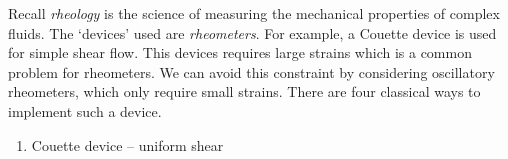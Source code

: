 \documentclass{jknotes}
\begin{document}
Recall \emph{rheology} is the science of measuring the mechanical properties
of complex fluids. The `devices' used are \emph{rheometers}. For example, a
Couette device is used for simple shear flow. This devices requires large
strains which is a common problem for rheometers. We can avoid this constraint
by considering oscillatory rheometers, which only require small strains. There
are four classical ways to implement such a device.
\begin{enumerate}
	\item Couette device -- uniform shear
		\begin{center}
		\end{center}


\end{enumerate}
\end{document}
